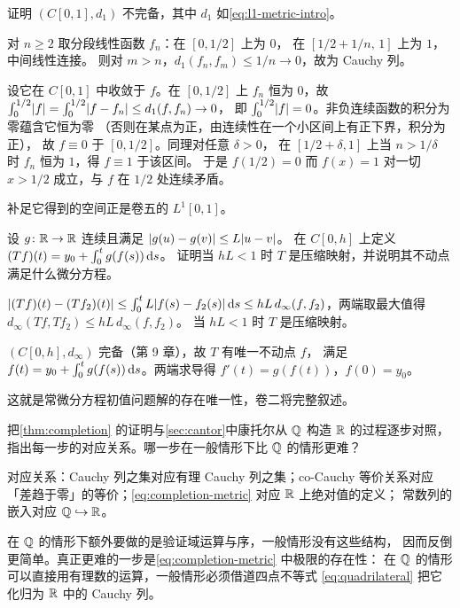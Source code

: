 \begin{exercise}[延伸]
  \label{exr:C1-not-complete}
  证明 \((C[0,1], d_{1})\) 不完备，其中 \(d_{1}\) 如\cref{eq:l1-metric-intro}。
  \begin{solution}
    对 \(n \ge 2\) 取分段线性函数 \(f_{n}\)：在 \([0,1/2]\) 上为 \(0\)，
    在 \([1/2+1/n,\,1]\) 上为 \(1\)，中间线性连接。
    则对 \(m>n\)，\(d_{1}(f_{n},f_{m}) \le 1/n \to 0\)，故为 Cauchy 列。

    设它在 \(C[0,1]\) 中收敛于 \(f\)。在 \([0,1/2]\) 上 \(f_{n}\) 恒为 \(0\)，故
    \(\int_{0}^{1/2}\lvert f\rvert = \int_{0}^{1/2}\lvert f-f_{n}\rvert \le d_{1}(f,f_{n}) \to 0\)，
    即 \(\int_{0}^{1/2}\lvert f\rvert=0\)。非负连续函数的积分为零蕴含它恒为零
    （否则在某点为正，由连续性在一个小区间上有正下界，积分为正），
    故 \(f \equiv 0\) 于 \([0,1/2]\)。同理对任意 \(\delta>0\)，
    在 \([1/2+\delta,1]\) 上当 \(n>1/\delta\) 时 \(f_{n}\) 恒为 \(1\)，得 \(f \equiv 1\) 于该区间。
    于是 \(f(1/2)=0\) 而 \(f(x)=1\) 对一切 \(x>1/2\) 成立，与 \(f\) 在 \(1/2\) 处连续矛盾。

    补足它得到的空间正是卷五的 \(L^{1}[0,1]\)。
  \end{solution}
\end{exercise}

\begin{exercise}[延伸]
  \label{exr:picard-preview}
  设 \(g \colon \mathbb{R} \to \mathbb{R}\) 连续且满足 \(\lvert g(u)-g(v)\rvert \le L\lvert u-v\rvert\)。
  在 \(C[0,h]\) 上定义 \((Tf)(t) = y_{0} + \int_{0}^{t} g(f(s))\mathop{}\!\mathrm{d} s\)。
  证明当 \(hL < 1\) 时 \(T\) 是压缩映射，并说明其不动点满足什么微分方程。
  \begin{solution}
    \(\lvert(Tf)(t)-(Tf_{2})(t)\rvert \le \int_{0}^{t} L\lvert f(s)-f_{2}(s)\rvert\mathop{}\!\mathrm{d} s
      \le hL\, d_{\infty}(f,f_{2})\)，两端取最大值得
    \(d_{\infty}(Tf,Tf_{2}) \le hL\, d_{\infty}(f,f_{2})\)。
    当 \(hL<1\) 时 \(T\) 是压缩映射。

    \((C[0,h], d_{\infty})\) 完备（第 9 章），故 \(T\) 有唯一不动点 \(f\)，
    满足 \(f(t) = y_{0}+\int_{0}^{t} g(f(s))\mathop{}\!\mathrm{d} s\)。两端求导得
    \(f'(t) = g(f(t))\)，\(f(0)=y_{0}\)。

    这就是常微分方程初值问题解的存在唯一性，卷二将完整叙述。
  \end{solution}
\end{exercise}

\begin{exercise}[延伸]
  \label{exr:completion-vs-ch1}
  把\cref{thm:completion} 的证明与\cref{sec:cantor}中康托尔从 \(\mathbb{Q}\) 构造 \(\mathbb{R}\)
  的过程逐步对照，指出每一步的对应关系。哪一步在一般情形下比 \(\mathbb{Q}\) 的情形更难？
  \begin{solution}
    对应关系：Cauchy 列之集对应有理 Cauchy 列之集；co-Cauchy 等价关系对应
    「差趋于零」的等价；\cref{eq:completion-metric} 对应 \(\mathbb{R}\) 上绝对值的定义；
    常数列的嵌入对应 \(\mathbb{Q} \hookrightarrow \mathbb{R}\)。

    在 \(\mathbb{Q}\) 的情形下额外要做的是验证域运算与序，一般情形没有这些结构，
    因而反倒更简单。真正更难的一步是\cref{eq:completion-metric} 中极限的存在性：
    在 \(\mathbb{Q}\) 的情形可以直接用有理数的运算，一般情形必须借道四点不等式%
    \cref{eq:quadrilateral} 把它化归为 \(\mathbb{R}\) 中的 Cauchy 列。
  \end{solution}
\end{exercise}

